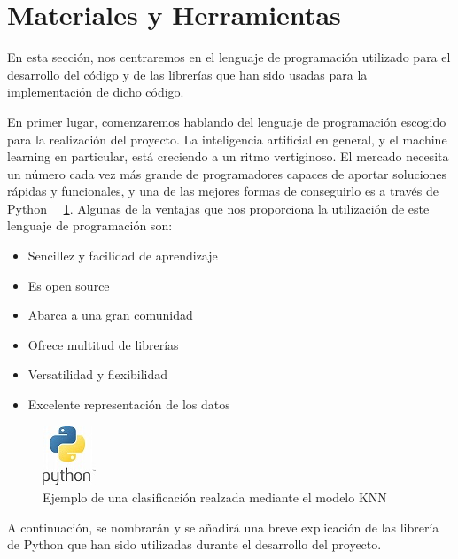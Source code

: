 \documentclass[conference,a4paper]{IEEEtran}
\begin{document}
\section{Materiales y Herramientas}

En esta sección, nos centraremos en el lenguaje de programación utilizado para el desarrollo del código y de las librerías que han sido usadas para la implementación de dicho código.

En primer lugar, comenzaremos hablando del lenguaje de programación escogido para la realización del proyecto. La inteligencia artificial en general, y el machine learning en particular, está creciendo a un ritmo vertiginoso. El mercado necesita un número cada vez más grande de programadores capaces de aportar soluciones rápidas y funcionales, y una de las mejores formas de conseguirlo es a través de Python~\cite{b11} ~\ref{fig:python}. Algunas de la ventajas que nos proporciona la utilización de este lenguaje de programación son:

\begin{itemize}
\item Sencillez y facilidad de aprendizaje
\item Es open source
\item Abarca a una gran comunidad
\item Ofrece multitud de librerías
\item Versatilidad y flexibilidad
\item Excelente representación de los datos
\end{itemize}

\begin{figure}
  \centering
  \includegraphics{python}
  \caption{Ejemplo de una clasificación realzada mediante el modelo KNN}
  \label{fig:python}
\end{figure} 

\newpage

A continuación, se nombrarán y se añadirá una breve explicación de las librería de Python que han sido utilizadas durante el desarrollo del proyecto. 
\end{document}
